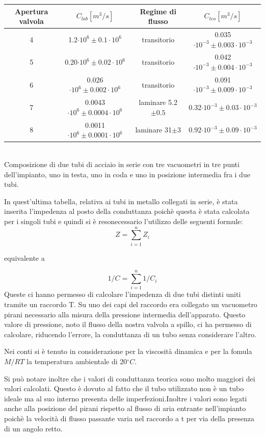 \documentclass[a4paper,11pt]{article}
\begin{document}
\begin{center}
\vspace{15pt}
\begin{tabular}{|c|c|c|c|}
\hline Apertura valvola & $C_{lab} [m^3/s]$ & Regime di flusso & $C_{teo} [m^3/s]$ \\ 
\hline 4 & 1.2$\cdot10^{6}\pm 0.1\cdot10^{6} $ & transitorio & 0.035 $\cdot10^{-3}\pm 0.003\cdot10^{-3}$ \\ 
\hline 5 & 0.20$\cdot10^{6}\pm 0.02\cdot10^{6}$ & transitorio & 0.042 $\cdot10^{-3}\pm 0.004\cdot10^{-3}$\\ 
\hline 6 & 0.026$\cdot10^{6}\pm 0.002\cdot10^{6}$ & transitorio & 0.091$\cdot10^{-3}\pm 0.009\cdot10^{-3}$ \\
\hline 7 & 0.0043$\cdot10^{6}\pm 0.0004\cdot10^{6}$ & laminare 5.2$\pm0.5$ & 0.32$\cdot10^{-3}\pm 0.03\cdot10^{-3}$ \\
\hline 8 & 0.0011$\cdot10^{6}\pm 0.0001\cdot10^{6}$ & laminare 31$\pm3$ & 0.92$\cdot10^{-3}\pm 0.09\cdot10^{-3}$ \\ 
\hline 
\end{tabular}\\
\vspace{5pt}
Composizione di due tubi di acciaio in serie con tre vacuometri in tre punti dell'impianto, uno in testa, uno in coda e uno in posizione intermedia fra i due tubi.
\vspace{10pt}
\end{center}
In quest'ultima tabella, relativa ai tubi in metallo collegati in serie, è stata inserita l'impedenza al posto della conduttanza poichè questa è stata calcolata per i singoli tubi e quindi si è resonecessario l'utilizzo delle seguenti formule: $$Z=\sum_{i=1}^{n}Z_i $$ \begin{center}equivalente a\end{center}  $$ 1/C=\sum_{i=1}^{n}1/C_i $$
Queste ci hanno permesso di calcolare l'impedenza di due tubi distinti uniti tramite un raccordo T. Su uno dei capi del raccordo era collegato un vacuometro pirani necessario alla misura della pressione intermedia dell'apparato. Questo valore di pressione, noto il flusso della nostra valvola a spillo, ci ha permesso di calcolare, riducendo l'errore, la conduttanza di un tubo senza considerare l'altro.

Nei conti si è tenuto in considerazione per la viscosità dinamica e per la fomula $ M/RT $ la temperatura ambientale di 20$^\circ C$.

Si può notare inoltre che i valori di conduttanza teorica sono molto maggiori dei valori calcolati. Questo è dovuto al fatto che il tubo utilizzato non è un tubo ideale ma al suo interno presenta delle imperfezioni.Inoltre i valori sono legati anche alla posizione del pirani rispetto al flusso di aria entrante nell'impianto poichè la velocità di flusso passante varia nel raccordo a t per via della presenza di un angolo retto.
\end{document}

